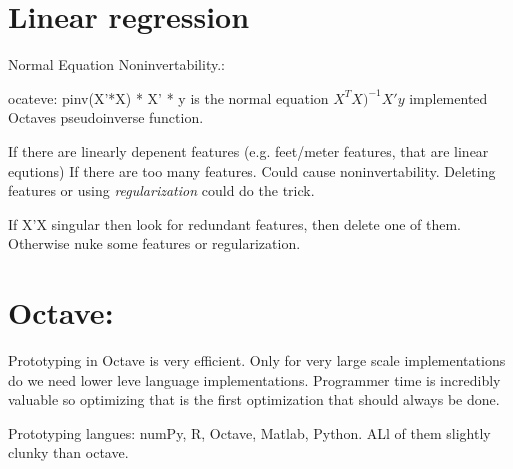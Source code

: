 \documentclass[a4, 12pt, english, USenglish]{scrreprt}
\newcommand{\idx}[1]{{\em #1}\index{#1}}
\begin{document}
\chapter{Linear regression}

Normal Equation Noninvertability.:

ocateve: pinv(X'*X) * X' * y  is the normal equation \(X^TX)^{-1} X' y\) implemented Octaves pseudoinverse function.

If there are linearly depenent features (e.g. feet/meter features, that are linear equtions)
If there are too many features. Could cause noninvertability.  Deleting features or using
\idx{regularization} could do the trick.


If X'X singular then look for redundant features, then delete one of them.  Otherwise nuke some features or regularization.


\chapter{Octave:}

Prototyping in Octave is very efficient.  Only for very large scale
implementations do we need lower leve language implementations.
Programmer time is incredibly valuable so optimizing that is the first
optimization that should always be done.

Prototyping langues: numPy, R, Octave, Matlab, Python.   ALl of them slightly clunky than octave.
\end{document}
